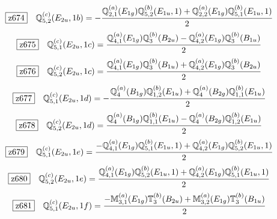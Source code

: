\documentclass[fleqn,10pt,landscape]{jsarticle}
\begin{document}
\begin{dmath*}
\hspace*{3mm}\fbox{z674}\quad \mathbb{Q}_{5,2}^{(c)}(E_{2u},1b)=- \frac{\mathbb{Q}_{2,1}^{(a)}(E_{1g}) \mathbb{Q}_{5,2}^{(b)}(E_{1u},1) + \mathbb{Q}_{2,2}^{(a)}(E_{1g}) \mathbb{Q}_{5,1}^{(b)}(E_{1u},1)}{2}
\end{dmath*}
\begin{dmath*}
\hspace*{3mm}\fbox{z675}\quad \mathbb{Q}_{5,1}^{(c)}(E_{2u},1c)=\frac{\mathbb{Q}_{4,1}^{(a)}(E_{1g}) \mathbb{Q}_{3}^{(b)}(B_{2u}) - \mathbb{Q}_{4,2}^{(a)}(E_{1g}) \mathbb{Q}_{3}^{(b)}(B_{1u})}{2}
\end{dmath*}
\begin{dmath*}
\hspace*{3mm}\fbox{z676}\quad \mathbb{Q}_{5,2}^{(c)}(E_{2u},1c)=\frac{\mathbb{Q}_{4,1}^{(a)}(E_{1g}) \mathbb{Q}_{3}^{(b)}(B_{1u}) + \mathbb{Q}_{4,2}^{(a)}(E_{1g}) \mathbb{Q}_{3}^{(b)}(B_{2u})}{2}
\end{dmath*}
\begin{dmath*}
\hspace*{3mm}\fbox{z677}\quad \mathbb{Q}_{5,1}^{(c)}(E_{2u},1d)=- \frac{\mathbb{Q}_{4}^{(a)}(B_{1g}) \mathbb{Q}_{1,2}^{(b)}(E_{1u}) + \mathbb{Q}_{4}^{(a)}(B_{2g}) \mathbb{Q}_{1,1}^{(b)}(E_{1u})}{2}
\end{dmath*}
\begin{dmath*}
\hspace*{3mm}\fbox{z678}\quad \mathbb{Q}_{5,2}^{(c)}(E_{2u},1d)=\frac{\mathbb{Q}_{4}^{(a)}(B_{1g}) \mathbb{Q}_{1,1}^{(b)}(E_{1u}) - \mathbb{Q}_{4}^{(a)}(B_{2g}) \mathbb{Q}_{1,2}^{(b)}(E_{1u})}{2}
\end{dmath*}
\begin{dmath*}
\hspace*{3mm}\fbox{z679}\quad \mathbb{Q}_{5,1}^{(c)}(E_{2u},1e)=\frac{- \mathbb{Q}_{4,1}^{(a)}(E_{1g}) \mathbb{Q}_{5,1}^{(b)}(E_{1u},1) + \mathbb{Q}_{4,2}^{(a)}(E_{1g}) \mathbb{Q}_{5,2}^{(b)}(E_{1u},1)}{2}
\end{dmath*}
\begin{dmath*}
\hspace*{3mm}\fbox{z680}\quad \mathbb{Q}_{5,2}^{(c)}(E_{2u},1e)=\frac{\mathbb{Q}_{4,1}^{(a)}(E_{1g}) \mathbb{Q}_{5,2}^{(b)}(E_{1u},1) + \mathbb{Q}_{4,2}^{(a)}(E_{1g}) \mathbb{Q}_{5,1}^{(b)}(E_{1u},1)}{2}
\end{dmath*}
\begin{dmath*}
\hspace*{3mm}\fbox{z681}\quad \mathbb{Q}_{5,1}^{(c)}(E_{2u},1f)=\frac{- \mathbb{M}_{3,1}^{(a)}(E_{1g}) \mathbb{T}_{3}^{(b)}(B_{2u}) + \mathbb{M}_{3,2}^{(a)}(E_{1g}) \mathbb{T}_{3}^{(b)}(B_{1u})}{2}
\end{dmath*}
\end{document}
